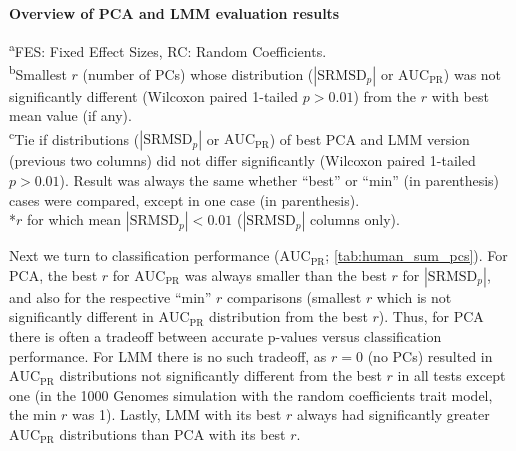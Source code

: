 \documentclass[11pt]{article}
\newcommand{\rmsd}{\text{SRMSD}_p}
\newcommand{\auc}{\text{AUC}_\text{PR}}
\begin{document}
\begin{table}[hb!]
  \centering
  \caption{
    \textbf{Overview of PCA and LMM evaluation results}
  }
  \label{tab:human_sum_pcs}
  \csvreader[
  tabular = lc|ccc|ccc,
  separator = tab,
  table head = 
  \toprule & Metric: & \multicolumn{3}{c|}{$|\rmsd|$} & \multicolumn{3}{c}{$\auc$} \\
  \midrule & & \multicolumn{2}{c}{Best (min\textsuperscript{b}) PCs} & & \multicolumn{2}{c}{Best (min\textsuperscript{b}) PCs} & \\
  Dataset & {Trait model\textsuperscript{a}} & PCA & LMM & {Best\textsuperscript{c}} & PCA & LMM & {Best\textsuperscript{c}} \\\midrule,
  late after last line = \\\bottomrule
  ]{../data/stats.txt}{}{\csvlinetotablerow}
  \begin{flushleft}
    \textsuperscript{a}FES: Fixed Effect Sizes, RC: Random Coefficients.\\
    \textsuperscript{b}Smallest $r$ (number of PCs) whose distribution ($|\rmsd|$ or $\auc$) was not significantly different (Wilcoxon paired 1-tailed $p > 0.01$) from the $r$ with best mean value (if any). \\
    \textsuperscript{c}Tie if distributions ($|\rmsd|$ or $\auc$) of best PCA and LMM version (previous two columns) did not differ significantly (Wilcoxon paired 1-tailed $p > 0.01$).
    Result was always the same whether ``best'' or ``min'' (in parenthesis) cases were compared, except in one case (in parenthesis).\\
    *$r$ for which mean $|\rmsd| < 0.01$ ($|\rmsd|$ columns only).
  \end{flushleft}
\end{table}

Next we turn to classification performance ($\auc$; \cref{tab:human_sum_pcs}).
For PCA, the best $r$ for $\auc$ was always smaller than the best $r$ for $|\rmsd|$, and also for the respective ``min'' $r$ comparisons (smallest $r$ which is not significantly different in $\auc$ distribution from the best $r$).
Thus, for PCA there is often a tradeoff between accurate p-values versus classification performance.
For LMM there is no such tradeoff, as $r=0$ (no PCs) resulted in $\auc$ distributions not significantly different from the best $r$ in all tests except one (in the 1000 Genomes simulation with the random coefficients trait model, the min $r$ was 1).
Lastly, LMM with its best $r$ always had significantly greater $\auc$ distributions than PCA with its best $r$.
\end{document}
